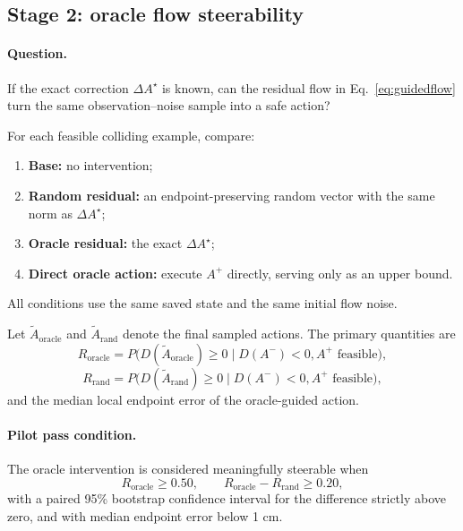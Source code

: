 \documentclass[10pt,conference]{IEEEtran}
\newcommand{\1}{\mathbf{1}}
\begin{document}
\subsection{Stage 2: oracle flow steerability}

\paragraph{Question.} If the exact correction $\Delta A^\star$ is known, can the residual flow in Eq.~\eqref{eq:guidedflow} turn the same observation--noise sample into a safe action?

For each feasible colliding example, compare:
\begin{enumerate}[leftmargin=*,nosep]
    \item \textbf{Base:} no intervention;
    \item \textbf{Random residual:} an endpoint-preserving random vector with the same norm as $\Delta A^\star$;
    \item \textbf{Oracle residual:} the exact $\Delta A^\star$;
    \item \textbf{Direct oracle action:} execute $A^+$ directly, serving only as an upper bound.
\end{enumerate}
All conditions use the same saved state and the same initial flow noise.

Let $\widetilde A_{\mathrm{oracle}}$ and $\widetilde A_{\mathrm{rand}}$ denote the final sampled actions. The primary quantities are
\begin{equation}
R_{\mathrm{oracle}}
=P\big(D(\widetilde A_{\mathrm{oracle}})\geq 0
\mid D(A^-)<0, A^+\text{ feasible}\big),
\label{eq:roracle}
\end{equation}
\begin{equation}
R_{\mathrm{rand}}
=P\big(D(\widetilde A_{\mathrm{rand}})\geq 0
\mid D(A^-)<0, A^+\text{ feasible}\big),
\label{eq:rrand}
\end{equation}
and the median local endpoint error of the oracle-guided action.

\paragraph{Pilot pass condition.}
The oracle intervention is considered meaningfully steerable when
\begin{equation}
    R_{\mathrm{oracle}}\geq 0.50,
    \qquad
    R_{\mathrm{oracle}}-R_{\mathrm{rand}}\geq 0.20,
\end{equation}
with a paired 95\% bootstrap confidence interval for the difference strictly above zero, and with median endpoint error below 1 cm.
\end{document}
